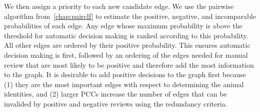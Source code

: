 We then assign a priority to each new candidate edge.
We use the pairwise algorithm from~\cref{chap:pairclf} to estimate the positive, negative, and incomparable
  probabilities of each edge.
Any edge whose maximum probability is above the threshold for automatic decision making is ranked according to
  this probability.
All other edges are ordered by their positive probability.
This ensures automatic decision making is first, followed by an ordering of the edges needed for manual review
  that are most likely to be positive and therefore add the most information to the graph.
It is desirable to add positive decisions to the graph first because
(1) they are the most important edges with respect to determining the animal identities, and
(2) larger PCCs increase the number of edges that can be invalided by positive and negative reviews using the
  redundancy criteria.






